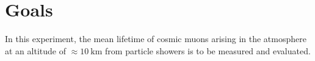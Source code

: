 \chapter{Goals}
\label{cha:Goals}
In this experiment, the mean lifetime of cosmic muons arising in the atmosphere at an altitude of $\approx \qty{10}{\kilo\meter}$ from particle showers
 is to be measured and evaluated.
